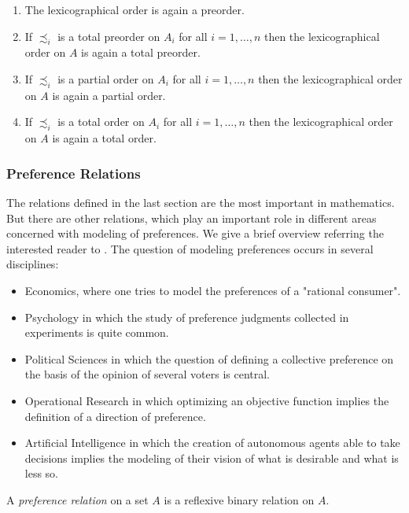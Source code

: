 ﻿\documentclass[a4paper,11pt,final]{article}
\numberwithin{equation}{subsection}
\begin{document}
\begin{prop}
\begin{enumerate}
\item The lexicographical order is again a preorder.
\item If $\precsim_i$ is a total preorder on $A_i$ for all $i=1,\dotsc,n$ then the lexicographical order on $A$ is again a total preorder.
\item If $\precsim_i$ is a partial order on $A_i$ for all $i=1,\dotsc,n$ then the lexicographical order on $A$ is again a partial order.
\item If $\precsim_i$ is a total order on $A_i$ for all $i=1,\dotsc,n$ then the lexicographical order on $A$ is again a total order.
\end{enumerate}
\end{prop}

\subsubsection{Preference Relations}
The relations defined in the last section are the most important in mathematics. But there are other relations, which play an important role in different areas concerned with modeling of preferences. We give a brief overview referring the interested reader to \cite{pref}. The question of modeling preferences occurs in several disciplines:
\begin{itemize}
\item Economics, where one tries to model the preferences of a "rational consumer".
\item Psychology in which the study of preference judgments collected in experiments is quite common.
\item Political Sciences in which the question of defining a collective preference on the basis of the opinion of several voters is central.
\item Operational Research in which optimizing an objective function implies the definition of a direction of preference.
\item Artificial Intelligence in which the creation of autonomous agents able to take decisions implies the modeling of their vision of what is desirable and what is less so.
\end{itemize}

\begin{defi}
A \emph{preference relation} on a set $A$ is a reflexive binary relation on $A$.
\end{defi}
\end{document}
